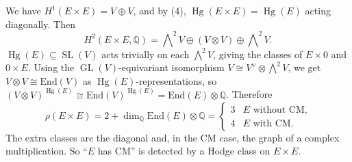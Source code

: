 \documentclass[12pt]{amsart}
\newcommand{\Q}{\mathbb{Q}}
\newcommand{\End}{\text{End}}
\DeclareMathOperator{\GL}{GL}
\DeclareMathOperator{\SL}{SL}
\DeclareMathOperator{\Hg}{Hg}
\let\oldbigwedge\bigwedge
\renewcommand{\bigwedge}{\mathop{\textstyle\oldbigwedge}\nolimits}
\theoremstyle{definition}
\theoremstyle{remark}
\numberwithin{equation}{section}
\begin{document}
\begin{example}\label{ex:ExE}
    We have $H^1(E \times E) = V \oplus V$, and by (4),
    $\Hg(E \times E) = \Hg(E)$ acting diagonally. Then
    \begin{equation*}
        H^2(E \times E, \Q) = \bigwedge^2 V \oplus (V \otimes V) \oplus
        \bigwedge^2 V.
    \end{equation*}
    $\Hg(E) \subseteq \SL(V)$ acts trivially on each $\bigwedge^2 V$, giving the
    classes of $E \times 0$ and $0 \times E$. Using the
    $\GL(V)$-equivariant isomorphism $V \cong V^\vee \otimes \bigwedge^2 V$, we
    get $V \otimes V \cong \End(V)$ as $\Hg(E)$-representations, so
    $(V \otimes V)^{\Hg(E)} \cong \End(V)^{\Hg(E)} = \End(E) \otimes \Q$.
    Therefore
    \begin{equation*}
        \rho(E \times E) = 2 + \dim_\Q \End(E) \otimes \Q =
        \begin{cases}
            3 & E \text{ without CM,}\\
            4 & E \text{ with CM.}
        \end{cases}
    \end{equation*}
    The extra classes are the diagonal and, in the CM case, the graph of a
    complex multiplication. So ``$E$ has CM'' is detected by a Hodge class on
    $E \times E$.
\end{example}
\end{document}
